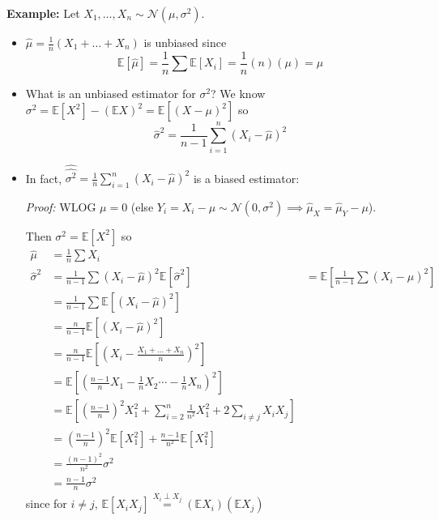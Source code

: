 \documentclass[12pt]{report}
\renewcommand{\hat}[1]{\widehat{#1}}
\newcommand{\E}{\mathbb{E}}
\newcommand{\Nc}{\mathcal{N}}
\newcommand*{\tbf}[1]{\ifmmode\mathbf{#1}\else\textbf{#1}\fi}
\newenvironment*{proof}[1][blue]{
\begin{tcolorbox}[
    parbox=false,
    colback=#1!5!white,
    colframe=#1!75!black,
    breakable
]}
{\end{tcolorbox}}
\begin{document}
\tbf{Example:} Let $X_1, \dots, X_n \sim \Nc(\mu, \sigma^2)$.
\begin{itemize}
    \item $\hat \mu = \frac{1}{n}(X_1 + \dots + X_n)$ is unbiased since
          \[\E[\hat \mu] = \frac{1}{n} \sum \E[X_i] = \frac{1}{n}(n)(\mu) = \mu\]
    \item What is an unbiased estimator for $\sigma^2$? We know $\sigma^2 = \E[X^2] - (\E X)^2 = \E[(X - \mu)^2]$ so
          \[\hat \sigma^2 = \frac{1}{n-1} \sum_{i=1}^{n} (X_i - \hat \mu)^2 \]

    \item In fact, $\hat{\hat{\sigma^2}} = \frac{1}{n} \sum_{i=1}^n (X_i - \hat \mu)^2$ is a biased estimator:

          \begin{proof}
              \emph{Proof:} WLOG $\mu = 0$ (else $Y_i = X_i - \mu \sim \Nc(0, \sigma^2) \implies \hat \mu_X = \hat \mu_Y - \mu$).

              Then $\sigma^2 = \E[X^2]$ so
              \begin{align*}
                  \hat \mu          & = \frac{1}{n} \sum X_i                                                                                               \\
                  \hat \sigma^2     & = \frac{1}{n-1} \sum (X_i - \hat \mu)^2
                  \E[\hat \sigma^2] & = \E\left[\frac{1}{n-1} \sum (X_i - \hat \mu)^2\right]                                                               \\
                                    & = \frac{1}{n-1} \sum \E[(X_i - \hat \mu)^2]                                                                          \\
                                    & = \frac{n}{n-1} \E[(X_i - \hat \mu)^2]                                                                               \\
                                    & = \frac{n}{n-1} \E\left[\left(X_i - \frac{X_1 + \dots + X_n}{n}\right)^2\right]                                      \\
                                    & = \E\left[\left(\frac{n-1}{n}X_1 - \frac{1}{n} X_2 \cdots - \frac{1}{n} X_n\right)^2\right]                          \\
                                    & = \E\left[\left(\frac{n-1}{n}\right)^2 X_1^2 + \sum_{i=2}^{n} \frac{1}{n^2} X_1^2 + 2 \sum_{i\neq j} X_i X_j \right] \\
                                    & = (\frac{n-1}{n})^2 \E[X_1^2] + \frac{n-1}{n^2} \E[X_1^2]                                                            \\
                                    & = \frac{(n-1)^2}{n^2} \sigma^2                                                                                       \\
                                    & = \frac{n-1}{n} \sigma^2
              \end{align*}
              since for $i \neq j$, $\E[X_i X_j] \overset{X_i \perp X_j}{=} (\E X_i)(\E X_j)$
          \end{proof}
\end{itemize}
\end{document}

